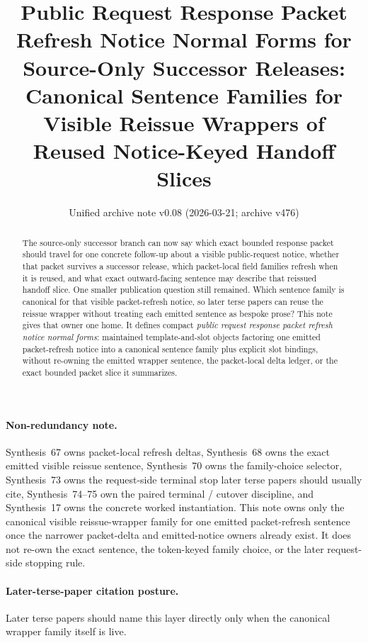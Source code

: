\documentclass[11pt]{article}
\title{Public Request Response Packet Refresh Notice Normal Forms for Source-Only Successor Releases:\\[0.5ex]
\large Canonical Sentence Families for Visible Reissue Wrappers of Reused Notice-Keyed Handoff Slices}
\author{}
\date{Unified archive note v0.08 (2026-03-21; archive v476)}
\begin{document}
\maketitle

\begin{abstract}
The source-only successor branch can now say which exact bounded response packet should travel for one concrete follow-up about a visible public-request notice, whether that packet survives a successor release, which packet-local field families refresh when it is reused, and what exact outward-facing sentence may describe that reissued handoff slice. One smaller publication question still remained. Which sentence family is canonical for that visible packet-refresh notice, so later terse papers can reuse the reissue wrapper without treating each emitted sentence as bespoke prose? This note gives that owner one home. It defines compact \emph{public request response packet refresh notice normal forms}: maintained template-and-slot objects factoring one emitted packet-refresh notice into a canonical sentence family plus explicit slot bindings, without re-owning the emitted wrapper sentence, the packet-local delta ledger, or the exact bounded packet slice it summarizes.
\end{abstract}

\paragraph{Non-redundancy note.}
Synthesis~67 owns packet-local refresh deltas, Synthesis~68 owns the exact emitted visible reissue sentence, Synthesis~70 owns the family-choice selector, Synthesis~73 owns the request-side terminal stop later terse papers should usually cite, Synthesis~74--75 own the paired terminal / cutover discipline, and Synthesis~17 owns the concrete worked instantiation.\cite{series:publicrequestresponsepacketdeltas,series:publicrequestresponsepacketrefreshnotices,series:publicrequestresponsepacketrefreshnoticeselections,series:publicrequestresponsepacketrefreshresponsepacketclosureverdicts,series:pairedterminalcitationdiscipline,series:pairedterminalcutoverrule,series:workedexample}
This note owns only the canonical visible reissue-wrapper family for one emitted packet-refresh sentence once the narrower packet-delta and emitted-notice owners already exist. It does not re-own the exact sentence, the token-keyed family choice, or the later request-side stopping rule.

\paragraph{Later-terse-paper citation posture.}
Later terse papers should name this layer directly only when the canonical wrapper family itself is live.
\end{document}
